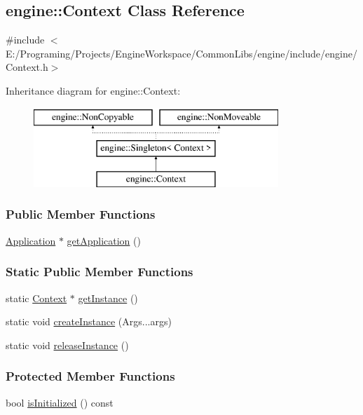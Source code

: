 \hypertarget{a00012}{}\subsection{engine\+:\+:Context Class Reference}
\label{a00012}


{\ttfamily \#include $<$E\+:/\+Programing/\+Projects/\+Engine\+Workspace/\+Common\+Libs/engine/include/engine/\+Context.\+h$>$}

Inheritance diagram for engine\+:\+:Context\+:\begin{figure}[H]
\begin{center}
\leavevmode
\includegraphics[height=3.000000cm]{a00012}
\end{center}
\end{figure}
\subsubsection*{Public Member Functions}
\begin{DoxyCompactItemize}
\item 
\hyperlink{a00002}{Application} $\ast$ \hyperlink{a00012_a6f657b971312b31eab5ff0b2148fab05}{get\+Application} ()
\end{DoxyCompactItemize}
\subsubsection*{Static Public Member Functions}
\begin{DoxyCompactItemize}
\item 
static \hyperlink{a00012}{Context} $\ast$ \hyperlink{a00069_a90ed1f21b1811a569eafccc78fcd12ca}{get\+Instance} ()
\item 
static void \hyperlink{a00069_a571e434c8ff771bf65de40f8a7b22076}{create\+Instance} (Args...\+args)
\item 
static void \hyperlink{a00069_a3fbed1f6a78cdf1d0c11467a3be61841}{release\+Instance} ()
\end{DoxyCompactItemize}
\subsubsection*{Protected Member Functions}
\begin{DoxyCompactItemize}
\item 
bool \hyperlink{a00012_ac532ff9bb55da7d1c351f1c2a0064f6d}{is\+Initialized} () const 
\end{DoxyCompactItemize}
